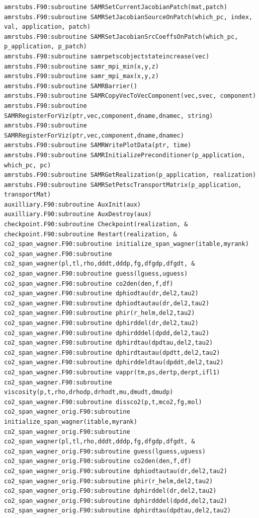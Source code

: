 \documentclass[12pt]{article}
\begin{document}
\begin{verbatim}
amrstubs.F90:subroutine SAMRSetCurrentJacobianPatch(mat,patch) 
amrstubs.F90:subroutine SAMRSetJacobianSourceOnPatch(which_pc, index, val, application, patch) 
amrstubs.F90:subroutine SAMRSetJacobianSrcCoeffsOnPatch(which_pc, p_application, p_patch) 
amrstubs.F90:subroutine samrpetscobjectstateincrease(vec)
amrstubs.F90:subroutine samr_mpi_min(x,y,z)
amrstubs.F90:subroutine samr_mpi_max(x,y,z)
amrstubs.F90:subroutine SAMRBarrier()
amrstubs.F90:subroutine SAMRCopyVecToVecComponent(vec,svec, component)
amrstubs.F90:subroutine SAMRRegisterForViz(ptr,vec,component,dname,dnamec, string)
amrstubs.F90:subroutine SAMRRegisterForViz(ptr,vec,component,dname,dnamec)
amrstubs.F90:subroutine SAMRWritePlotData(ptr, time)
amrstubs.F90:subroutine SAMRInitializePreconditioner(p_application, which_pc, pc)
amrstubs.F90:subroutine SAMRGetRealization(p_application, realization) 
amrstubs.F90:subroutine SAMRSetPetscTransportMatrix(p_application, transportMat) 
auxilliary.F90:subroutine AuxInit(aux)
auxilliary.F90:subroutine AuxDestroy(aux)
checkpoint.F90:subroutine Checkpoint(realization, &
checkpoint.F90:subroutine Restart(realization, &
co2_span_wagner.F90:subroutine initialize_span_wagner(itable,myrank)
co2_span_wagner.F90:subroutine co2_span_wagner(pl,tl,rho,dddt,dddp,fg,dfgdp,dfgdt, &
co2_span_wagner.F90:subroutine guess(lguess,uguess)
co2_span_wagner.F90:subroutine co2den(den,f,df)
co2_span_wagner.F90:subroutine dphiodtau(dr,del2,tau2)
co2_span_wagner.F90:subroutine dphiodtautau(dr,del2,tau2)
co2_span_wagner.F90:subroutine phir(r_helm,del2,tau2)
co2_span_wagner.F90:subroutine dphirddel(dr,del2,tau2)
co2_span_wagner.F90:subroutine dphirdddel(dpdd,del2,tau2)
co2_span_wagner.F90:subroutine dphirdtau(dpdtau,del2,tau2)
co2_span_wagner.F90:subroutine dphirdtautau(dpdtt,del2,tau2)
co2_span_wagner.F90:subroutine dphirddeldtau(dpddt,del2,tau2)
co2_span_wagner.F90:subroutine vappr(tm,ps,dertp,derpt,ifl1)
co2_span_wagner.F90:subroutine viscosity(p,t,rho,drhodp,drhodt,mu,dmudt,dmudp)
co2_span_wagner.F90:subroutine dissco2(p,t,mco2,fg,mol)
co2_span_wagner_orig.F90:subroutine initialize_span_wagner(itable,myrank)
co2_span_wagner_orig.F90:subroutine co2_span_wagner(pl,tl,rho,dddt,dddp,fg,dfgdp,dfgdt, &
co2_span_wagner_orig.F90:subroutine guess(lguess,uguess)
co2_span_wagner_orig.F90:subroutine co2den(den,f,df)
co2_span_wagner_orig.F90:subroutine dphiodtautau(dr,del2,tau2)
co2_span_wagner_orig.F90:subroutine phir(r_helm,del2,tau2)
co2_span_wagner_orig.F90:subroutine dphirddel(dr,del2,tau2)
co2_span_wagner_orig.F90:subroutine dphirdddel(dpdd,del2,tau2)
co2_span_wagner_orig.F90:subroutine dphirdtau(dpdtau,del2,tau2)

\end{verbatim}
\end{document}
